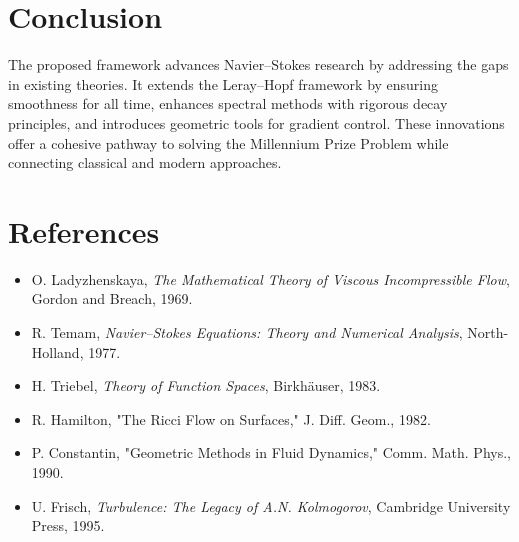 \documentclass[12pt]{article}
\theoremstyle{definition}
\begin{document}
\section{Conclusion}

The proposed framework advances Navier--Stokes research by addressing the gaps in existing theories. It extends the Leray--Hopf framework by ensuring smoothness for all time, enhances spectral methods with rigorous decay principles, and introduces geometric tools for gradient control. These innovations offer a cohesive pathway to solving the Millennium Prize Problem while connecting classical and modern approaches.

\section*{References}
\begin{itemize}
    \item O. Ladyzhenskaya, \emph{The Mathematical Theory of Viscous Incompressible Flow}, Gordon and Breach, 1969.
    \item R. Temam, \emph{Navier--Stokes Equations: Theory and Numerical Analysis}, North-Holland, 1977.
    \item H. Triebel, \emph{Theory of Function Spaces}, Birkh\"auser, 1983.
    \item R. Hamilton, "The Ricci Flow on Surfaces," J. Diff. Geom., 1982.
    \item P. Constantin, "Geometric Methods in Fluid Dynamics," Comm. Math. Phys., 1990.
    \item U. Frisch, \emph{Turbulence: The Legacy of A.N. Kolmogorov}, Cambridge University Press, 1995.
\end{itemize}
\end{document}
